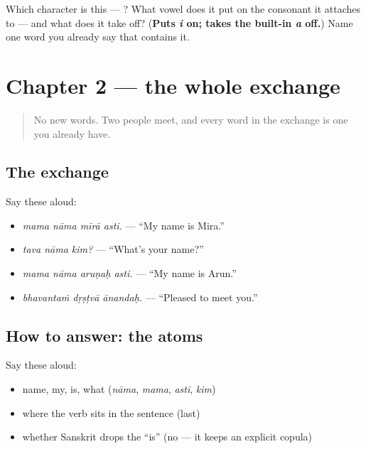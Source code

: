 \begin{tcolorbox}[breakable,colback=teal!4,colframe=teal!35!black,title={Before you move on}]
Which character is this — ? What vowel does it put on the consonant it attaches to — and what does it take off? (\textbf{Puts \emph{i} on; takes the built-in \emph{a} off.}) Name one word you already say that contains it.
\end{tcolorbox}
\section[Practice]{Chapter 2 — the whole exchange}

\label{lesson:SA-C02-practice}



\begin{quote}
No new words. Two people meet, and every word in the exchange is one you already have.
\end{quote}

\subsection*{The exchange}
Say these aloud:

\begin{itemize}
\raggedright
  \item \emph{mama nāma mīrā asti.} — \textquotedblleft{}My name is Mira.\textquotedblright{}
  \item \emph{tava nāma kim?} — \textquotedblleft{}What's your name?\textquotedblright{}
  \item \emph{mama nāma aruṇaḥ asti.} — \textquotedblleft{}My name is Arun.\textquotedblright{}
  \item \emph{bhavantaṁ dṛṣṭvā ānandaḥ.} — \textquotedblleft{}Pleased to meet you.\textquotedblright{}
\end{itemize}

\subsection*{How to answer: the atoms}
Say these aloud:

\begin{itemize}
\raggedright
  \item name, my, is, what (\emph{nāma}, \emph{mama}, \emph{asti}, \emph{kim})
  \item where the verb sits in the sentence (last)
  \item whether Sanskrit drops the \textquotedblleft{}is\textquotedblright{} (no — it keeps an explicit copula)
\end{itemize}

